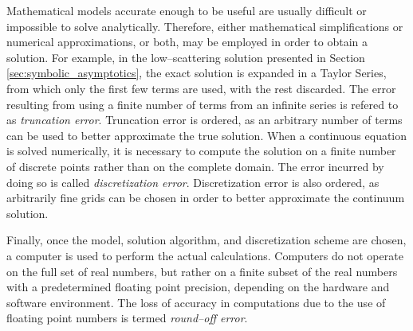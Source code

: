 Mathematical models accurate enough to be useful are usually difficult or impossible to solve analytically.
Therefore, either mathematical simplifications or numerical approximations, or both, may be employed in order to obtain a solution.
For example, in the low--scattering solution presented in Section \ref{sec:symbolic_asymptotics}, the exact solution is expanded in a Taylor Series, from which only the first few terms are used, with the rest discarded.
The error resulting from using a finite number of terms from an infinite series is refered to as \textit{truncation error}.
Truncation error is ordered, as an arbitrary number of terms can be used to better approximate the true solution.
When a continuous equation is solved numerically, it is necessary to compute the solution on a finite number of discrete points rather than on the complete domain.
The error incurred by doing so is called \textit{discretization error}.
Discretization error is also ordered, as arbitrarily fine grids can be chosen in order to better approximate the continuum solution.

Finally, once the model, solution algorithm, and discretization scheme are chosen, a computer is used to perform the actual calculations.
Computers do not operate on the full set of real numbers, but rather on a finite subset of the real numbers with a predetermined floating point precision, depending on the hardware and software environment.
The loss of accuracy in computations due to the use of floating point numbers is termed \textit{round--off error}.



